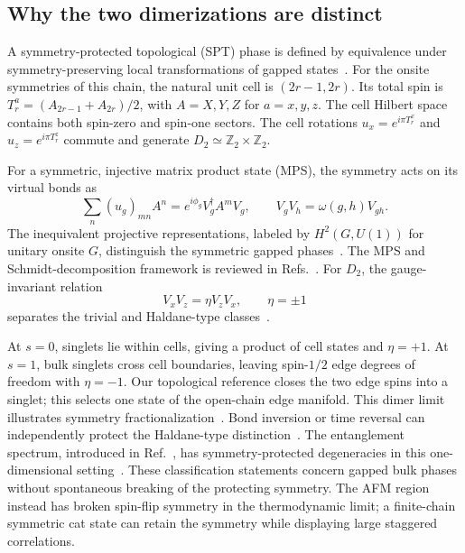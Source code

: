 \subsection{Why the two dimerizations are distinct}

A symmetry-protected topological (SPT) phase is defined by equivalence under symmetry-preserving local transformations of gapped states~\cite{gu2009tensor,chen2010local}.
For the onsite symmetries of this chain, the natural unit cell is $(2r-1,2r)$.
Its total spin is $T_r^a=(A_{2r-1}+A_{2r})/2$, with $A=X,Y,Z$ for $a=x,y,z$.
The cell Hilbert space contains both spin-zero and spin-one sectors.
The cell rotations $u_x=e^{i\pi T_r^x}$ and $u_z=e^{i\pi T_r^z}$ commute and generate $D_2\simeq\mathbb Z_2\times\mathbb Z_2$.

For a symmetric, injective matrix product state (MPS), the symmetry acts on its virtual bonds as
\begin{equation}
\sum_n(u_g)_{mn}A^n=e^{i\phi_g}V_g^\dagger A^mV_g,
\qquad V_gV_h=\omega(g,h)V_{gh}.
\label{eq:mps-symmetry}
\end{equation}
The inequivalent projective representations, labeled by $H^2(G,U(1))$ for unitary onsite $G$, distinguish the symmetric gapped phases~\cite{chen2011classification,schuch2011classifying}.
The MPS and Schmidt-decomposition framework is reviewed in Refs.~\cite{schollwock2011density,cirac2021matrix}.
For $D_2$, the gauge-invariant relation
\begin{equation}
V_xV_z=\eta V_zV_x,\qquad \eta=\pm1
\label{eq:projective-index}
\end{equation}
separates the trivial and Haldane-type classes~\cite{pollmann2012detection}.

At $s=0$, singlets lie within cells, giving a product of cell states and $\eta=+1$.
At $s=1$, bulk singlets cross cell boundaries, leaving spin-$1/2$ edge degrees of freedom with $\eta=-1$.
Our topological reference closes the two edge spins into a singlet; this selects one state of the open-chain edge manifold.
This dimer limit illustrates symmetry fractionalization~\cite{verresen2017onedimensional}.
Bond inversion or time reversal can independently protect the Haldane-type distinction~\cite{pollmann2012symmetry}.
The entanglement spectrum, introduced in Ref.~\cite{li2008entanglement}, has symmetry-protected degeneracies in this one-dimensional setting~\cite{pollmann2010entanglement}.
These classification statements concern gapped bulk phases without spontaneous breaking of the protecting symmetry. The AFM region instead has broken spin-flip symmetry in the thermodynamic limit; a finite-chain symmetric cat state can retain the symmetry while displaying large staggered correlations.

